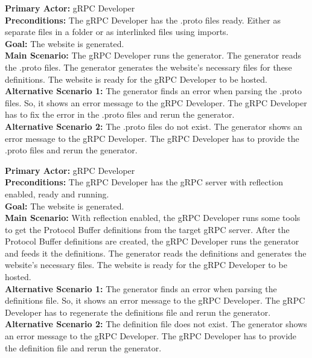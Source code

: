 
\textbf{Primary Actor:} gRPC Developer\\
\textbf{Preconditions:} The gRPC Developer has the .proto files ready.
Either as separate files in a folder or as interlinked files using imports.\\
\textbf{Goal:} The website is generated.\\
\textbf{Main Scenario:}
The gRPC Developer runs the generator.
The generator reads the .proto files.
The generator generates the website's necessary files for these definitions.
The website is ready for the gRPC Developer to be hosted.\\
\textbf{Alternative Scenario 1:}
The generator finds an error when parsing the .proto files.
So, it shows an error message to the gRPC Developer.
The gRPC Developer has to fix the error in the .proto files and rerun the generator.\\
\textbf{Alternative Scenario 2:}
The .proto files do not exist.
The generator shows an error message to the gRPC Developer.
The gRPC Developer has to provide the .proto files and rerun the generator.


\textbf{Primary Actor:} gRPC Developer\\
\textbf{Preconditions:} The gRPC Developer has the gRPC server with reflection enabled, ready and running.\\
\textbf{Goal:} The website is generated.\\
\textbf{Main Scenario:}
With reflection enabled, the gRPC Developer runs some tools to get the Protocol Buffer definitions from the target gRPC server.
After the Protocol Buffer definitions are created, the gRPC Developer runs the generator and feeds it the definitions.
The generator reads the definitions and generates the website's necessary files.
The website is ready for the gRPC Developer to be hosted.\\
\textbf{Alternative Scenario 1:}
The generator finds an error when parsing the definitions file.
So, it shows an error message to the gRPC Developer.
The gRPC Developer has to regenerate the definitions file and rerun the generator.\\
\textbf{Alternative Scenario 2:}
The definition file does not exist.
The generator shows an error message to the gRPC Developer.
The gRPC Developer has to provide the definition file and rerun the generator.



